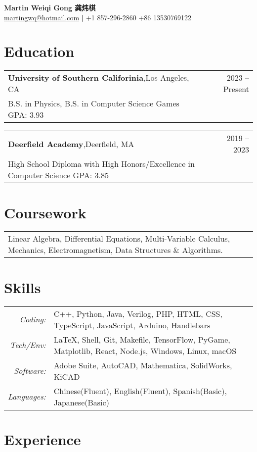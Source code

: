 \documentclass[oneside, 11pt]{article}
\newcommand*{\experienceEntry}[4]{
	\noindent
	\begin{tabularx}{\textwidth}{Xr}
	\textbf{#1},\quad #2 & #3\\
	#4
	\end{tabularx}
	\vspace{-0.75\baselineskip}
}
\begin{document}
\begin{center}
	\Large \textbf{Martin Weiqi Gong 龚炜棋}\\
	\normalsize \href{mailto:martingwq@hotmail.com}{martingwq@hotmail.com} \thinspace \textbf{|} \thinspace +1 857-296-2860 \thinspace +86 13530769122
\end{center}

\section*{Education}

\experienceEntry{University of Southern Califorinia}
	{Los Angeles, CA}
	{2023 -- Present}
	{B.S. in Physics, B.S. in Computer Science Games \quad GPA: 3.93}

\experienceEntry{Deerfield Academy}
	{Deerfield, MA}
	{2019 -- 2023}
	{High School Diploma with High Honors/Excellence in Computer Science \quad GPA: 3.85}

\section*{Coursework}

\begin{tabular}{ p{\textwidth - 1em} }
	Linear Algebra, Differential Equations, Multi-Variable Calculus, Mechanics, Electromagnetism, Data Structures \& Algorithms.
\end{tabular}

\section*{Skills}

\begin{tabularx}{\textwidth}{rX}
	\textit{Coding:} & C++, Python, Java, Verilog, PHP, HTML, CSS, TypeScript, JavaScript, Arduino, Handlebars\\
	\textit{Tech/Env:} & \LaTeX, Shell, Git, Makefile, TensorFlow, PyGame, Matplotlib, React, Node.js, Windows, Linux, macOS\\
	\textit{Software:} & Adobe Suite, AutoCAD, Mathematica, SolidWorks, KiCAD\\
	\textit{Languages:} & Chinese(Fluent), English(Fluent), Spanish(Basic), Japanese(Basic)
\end{tabularx}


\section*{Experience}
\end{document}
